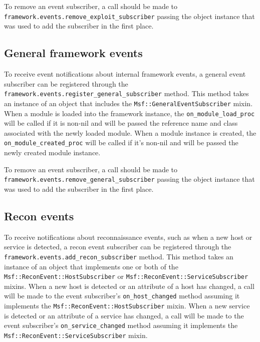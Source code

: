\documentclass{report}
\begin{document}
\par
To remove an event subscriber, a call should be made to\\
\texttt{framework.events.remove\_exploit\_subscriber} passing the
object instance that was used to add the subscriber in the first
place.

        \subsection{General framework events}

\par
To receive event notifications about internal framework events, a
general event subscriber can be registered through the
\texttt{framework.events.register\_general\_subscriber} method.
This method takes an instance of an object that includes the
\texttt{Msf::GeneralEventSubscriber} mixin.  When a module is loaded
into the framework instance, the \texttt{on\_module\_load\_proc}
will be called if it is non-nil and will be passed the reference
name and class associated with the newly loaded module. When a
module instance is created, the \texttt{on\_module\_created\_proc}
will be called if it's non-nil and will be passed the newly created
module instance.

\par
To remove an event subscriber, a call should be made to\\
\texttt{framework.events.remove\_general\_subscriber} passing the
object instance that was used to add the subscriber in the first
place.

        \subsection{Recon events}

\par
To receive notifications about reconnaissance events, such as when a
new host or service is detected, a recon event subscriber can be
registered through the
\texttt{framework.events.add\_recon\_subscriber} method.  This
method takes an instance of an object that implements one or both of
the \texttt{Msf::ReconEvent::HostSubscriber} or
\texttt{Msf::ReconEvent::ServiceSubscriber} mixins.  When a new host
is detected or an attribute of a host has changed, a call will be
made to the event subscriber's \texttt{on\_host\_changed} method
assuming it implements the \texttt{Msf::ReconEvent::HostSubscriber}
mixin.  When a new service is detected or an attribute of a service
has changed, a call will be made to the event subscriber's
\texttt{on\_service\_changed} method assuming it implements the
\texttt{Msf::ReconEvent::ServiceSubscriber} mixin.
\end{document}
